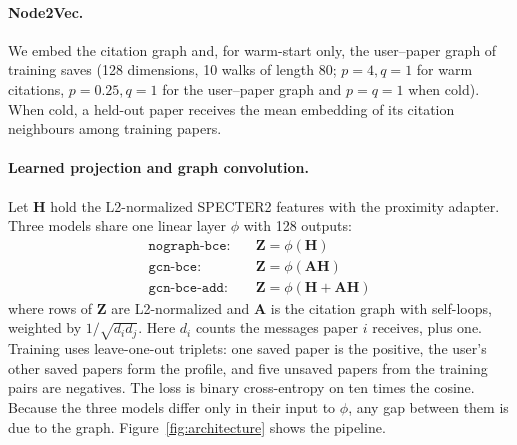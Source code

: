 \documentclass[10pt]{article}
\begin{document}
\paragraph{Node2Vec.} We embed the citation graph and, for warm-start only, the user--paper graph of training saves (128 dimensions, 10 walks of length 80; $p=4,q=1$ for warm citations, $p=0.25,q=1$ for the user--paper graph and $p=q=1$ when cold). When cold, a held-out paper receives the mean embedding of its citation neighbours among training papers.

\paragraph{Learned projection and graph convolution.} Let $\mathbf{H}$ hold the L2-normalized SPECTER2 features with the proximity adapter. Three models share one linear layer $\phi$ with 128 outputs:
\begin{align}
\texttt{nograph-bce}:&\quad \mathbf{Z}=\phi(\mathbf{H})\\
\texttt{gcn-bce}:&\quad \mathbf{Z}=\phi(\mathbf{A}\mathbf{H})\\
\texttt{gcn-bce-add}:&\quad \mathbf{Z}=\phi(\mathbf{H}+\mathbf{A}\mathbf{H})
\end{align}
where rows of $\mathbf{Z}$ are L2-normalized and $\mathbf{A}$ is the citation graph with self-loops, weighted by $1/\sqrt{d_i d_j}$. Here $d_i$ counts the messages paper $i$ receives, plus one. Training uses leave-one-out triplets: one saved paper is the positive, the user's other saved papers form the profile, and five unsaved papers from the training pairs are negatives. The loss is binary cross-entropy on ten times the cosine. Because the three models differ only in their input to $\phi$, any gap between them is due to the graph. Figure~\ref{fig:architecture} shows the pipeline.
\end{document}
